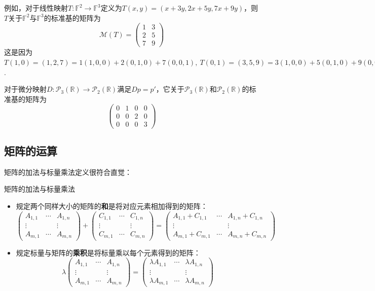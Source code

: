 \documentclass[lang=cn, zihao=5]{elegantbook}
\newcommand{\R}{\mathbb{R}}
\newcommand{\F}{\mathbb{F}}
\begin{document}
例如，对于线性映射$T:\F ^2 \to \F ^3$定义为$T(x,y)=(x+3y,2x+5y,7x+9y)$，则$T$关于$\F ^2$与$\F ^3$的标准基的矩阵为$$\mathcal{M}(T)= \begin{pmatrix}
	1 & 3 \\ 2 & 5 \\ 7 & 9
\end{pmatrix}$$
这是因为$T(1,0)=(1,2,7)=1(1,0,0)+2(0,1,0)+7(0,0,1),~T(0,1)=(3,5,9)=3(1,0,0)+5(0,1,0)+9(0,0,1)$.

对于微分映射$D:\mathcal{P}_3(\R) \to \mathcal{P}_2(\R)$满足$Dp=p'$，它关于$\mathcal{P}_3(\R)$和$\mathcal{P}_2(\R)$的标准基的矩阵为$$\begin{pmatrix}
	0 & 1 & 0 & 0 \\ 0 & 0 & 2 & 0 \\ 0 & 0 & 0 & 3
\end{pmatrix}$$

\subsection{矩阵的运算}

矩阵的加法与标量乘法定义很符合直觉：

\begin{definition}{矩阵的加法与标量乘法}
	\begin{itemize}
		\item 规定两个同样大小的矩阵的\textbf{和}是将对应元素相加得到的矩阵：$$\begin{pmatrix}
		A_{1,1} & \cdots & A_{1,n} \\
		\vdots &  & \vdots \\
		A_{m,1} & \cdots & A_{m,n}
	\end{pmatrix} + \begin{pmatrix}
		C_{1,1} & \cdots & C_{1,n} \\
		\vdots &  & \vdots \\
		C_{m,1} & \cdots & C_{m,n}
	\end{pmatrix} = \begin{pmatrix}
		A_{1,1}+C_{1,1} & \cdots & A_{1,n}+C_{1,n} \\
		\vdots &  & \vdots \\
		A_{m,1}+C_{m,1} & \cdots & A_{m,n}+C_{m,n}
	\end{pmatrix}$$
		\item 规定标量与矩阵的\textbf{乘积}是将标量乘以每个元素得到的矩阵：$$\lambda \begin{pmatrix}
		A_{1,1} & \cdots & A_{1,n} \\
		\vdots &  & \vdots \\
		A_{m,1} & \cdots & A_{m,n}
	\end{pmatrix} = \begin{pmatrix}
		\lambda A_{1,1} & \cdots & \lambda A_{1,n} \\
		\vdots &  & \vdots \\
		\lambda A_{m,1} & \cdots & \lambda A_{m,n}
	\end{pmatrix}$$
	\end{itemize}
\end{definition}
\end{document}

